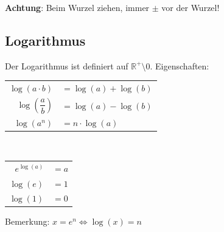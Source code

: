 \documentclass[a4paper, fontsize = 8pt, landscape]{scrartcl}
\newcommand{\R}[0]{\mathbb{R}}
\begin{document}
\begin{multicols*}{3}
    \textbf{Achtung}: Beim Wurzel ziehen, immer $\pm$ vor der Wurzel!


    \subsection{Logarithmus}

    Der Logarithmus ist definiert auf $\R^+ \setminus {0}$. Eigenschaften:

    \begin{center}
        \begin{minipage}{0.47 \linewidth}
            \begin{center}
                \renewcommand{\arraystretch}{1.35}
                \begin{tabular}{r l}
                    $\log(a \cdot b)$               & \hspace*{-10pt}$= \log(a) + \log(b)$
                    \\
                    $\log\left(\dfrac{a}{b}\right)$ & \hspace*{-10pt}$= \log(a) - \log(b)$ \\
                    $\log(a^n)$                     & \hspace*{-10pt}$= n \cdot \log(a)$   \\
                \end{tabular}
            \end{center}
        \end{minipage}
        \,\vline\,
        \begin{minipage}{0.47 \linewidth}
            \begin{center}
                \renewcommand{\arraystretch}{1.35}
                \begin{tabular}{r l}
                    $e^{\log(a)}$ & \hspace*{-10pt}$= a$ \\
                    $\log(e)$     & \hspace*{-10pt}$= 1$ \\
                    $\log(1)$     & \hspace*{-10pt}$= 0$ \\
                \end{tabular}
            \end{center}
        \end{minipage}
    \end{center}

    Bemerkung: $x = e^n \Leftrightarrow \log(x) = n$



\end{multicols*}
\end{document}
